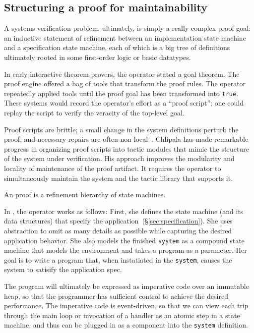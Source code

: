 \subsection{Structuring a proof for maintainability}

A systems verification problem, ultimately, is simply a really complex
proof goal: an inductive statement of refinement between an implementation
state machine and a specification state machine, each of which is a
big tree of definitions ultimately rooted in some first-order logic or
basic datatypes.

In early interactive theorem provers, the operator stated a goal theorem.
The proof engine offered a bag of tools that transform the proof rules.
The operator repeatedly applied tools until the proof goal has been
transformed into \texttt{true}.
These systems would record the operator's effort as a ``proof script'';
one could replay the script to verify the veracity of the top-level goal.

Proof scripts are brittle; a small change in the system definitions perturb
the proof, and necessary repairs are often non-local~\cite{}.
Chlipala has made remarkable progress in organizing proof scripts into
tactic modules that mimic the structure of the system under
verification. His approach improves the modularity and locality
of maintenance of the proof artifact.
It requires the operator to simultaneously maintain the system
and the tactic library that supports it.



An {\ironstar} proof is a refinement hierarchy of state machines.

In {\ironstar}, the operator works as follows:
First, she defines the state machine (and its data structures) that
specify the application~(\S\ref{sec:specification}).
She uses abstraction to omit as many details as possible while capturing the
desired application behavior.
She also models the finished \texttt{system} as a compound state machine that
models the environment and takes a program as a parameter.
Her goal is to write a program that, when instatiated in the \texttt{system},
causes the system to satisify the application spec.

The program will ultimately be expressed as
imperative code over an immutable heap,
so that the programmer has sufficient control to achieve the
desired performance.
The imperative code is event-driven, so that we can view each
trip through the main loop or invocation of a handler as an
atomic step in a state machine,
and thus can be plugged in as a component into the \texttt{system} definition.

